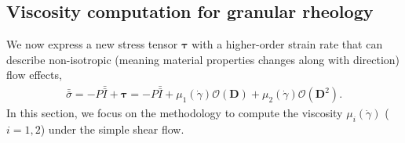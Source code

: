 


\subsection{Viscosity computation for granular rheology}
We now express a new stress tensor $\bm \tau$ with a higher-order strain rate that can describe non-isotropic (meaning material properties changes along with direction) flow effects,
\begin{align}
  \bar{\bar{\sigma}}
    = -P \bar{\bar{I}}  + \bm{\tau}
    =  -P \bar{\bar{I}}  
    + \mu_1(\dot{\gamma}) \mathcal{O}({\bm D})
    + \mu_2(\dot{\gamma}) \mathcal{O}({\bm D^2}).
  \end{align}
In this section, we focus on the methodology to compute the viscosity $\mu_i ({\dot{\gamma}})$ ($i = 1,2$) under the simple shear flow. 

